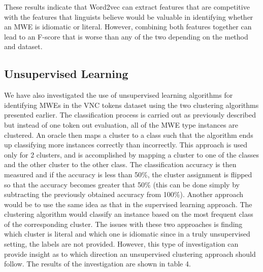 \documentclass[11pt]{article}
\begin{document}

These results indicate that Word2vec can extract features that are competitive with the features that linguists believe would be valuable in identifying whether an MWE is idiomatic or literal. However, combining both features together can lead to an F-score that is worse than any of the two depending on the method and dataset. 

\subsection{Unsupervised Learning}

We have also investigated the use of unsupervised learning algorithms for identifying MWEs in the VNC tokens dataset using the two clustering algorithms presented earlier. The classification process is carried out as previously described but instead of one token out evaluation, all of the MWE type instances are clustered. An oracle then maps a cluster to a class such that the algorithm ends up classifying more instances correctly than incorrectly. This approach is used only for 2 clusters, and is accomplished by mapping a cluster to one of the classes and the other cluster to the other class. The classification accuracy is then measured and if the accuracy is less than 50\%, the cluster assignment is flipped so that the accuracy becomes greater that 50\% (this can be done simply by subtracting the previously obtained accuracy from 100\%). Another approach would be to use the same idea as that in the supervised learning approach. The clustering algorithm would classify an instance based on the most frequent class of the corresponding cluster. The issues with these two approaches is finding which cluster is literal and which one is idiomatic since in a truly unsupervised setting, the labels are not provided. However, this type of investigation can provide insight as to which direction an unsupervised clustering approach should follow. The results of the investigation are shown in table 4.
\end{document}
